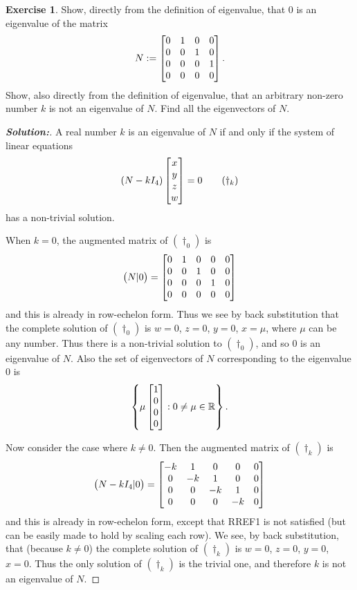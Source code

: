 \documentclass[a4paper]{amsart}
\theoremstyle{definition}
\newtheorem{exercise}{Exercise}
\newenvironment{solution}{\begin{proof}[\textbf{Solution:}] \vphantom{u}}{\end{proof}}
\begin{document}
\begin{exercise}\label{ex-evectors-iii}
 Show, directly from the definition of eigenvalue, that 0 is an eigenvalue
 of the matrix
 \[ N := \left[\begin{matrix} 
          0 & 1 & 0 & 0 \\
          0 & 0 & 1 & 0 \\
          0 & 0 & 0 & 1 \\
          0 & 0 & 0 & 0
         \end{matrix}\right].
 \]
 Show, also directly from the definition of eigenvalue, that an arbitrary non-zero
 number $k$ is not an eigenvalue of $N$.
 Find all the eigenvectors of $N$.
\end{exercise}
\begin{solution}
 A real number $k$ is an eigenvalue of $N$ if and only if the
 system of linear equations \[(N-kI_4)\left[\begin{matrix}
 x\\y\\z\\w\end{matrix}\right] = 0 \tag{$\dagger_k$}\] has a non-trivial
 solution.

 When $k = 0$, the augmented matrix of $(\dagger_0)$ is
 \[
 \big(N|0\big)= \left[\begin{matrix}
 0&1&0&0&0\\0&0&1&0&0\\0&0&0&1&0\\0&0&0&0&0\end{matrix}\right]
 \]
 and this
 is already in row-echelon form. Thus we see by back substitution
 that the complete solution of $(\dagger_0)$ is $w = 0$, $z = 0$,
 $y= 0$, $x = \mu$, where $\mu$ can be any number. Thus there is a
 non-trivial solution to $(\dagger_0)$, and so $0$ is an eigenvalue
 of $N$. Also the set of eigenvectors of $N$ corresponding to the
 eigenvalue $0$ is
 \[
 \left\{ \mu\left[\begin{matrix} 1\\0\\0\\0\end{matrix}\right] : 0 \neq \mu
 \in {\mathbb{R}} \right\}.
 \]

 Now consider the case where $k \neq 0$. Then the augmented matrix
 of $(\dagger_k)$ is
 \[
 \big(N-kI_4|0\big) = \left[\begin{matrix}
 -k&1&0&0&0\\0&-k&1&0&0\\0&0&-k&1&0\\0&0&0&-k&0\end{matrix}\right]
 \]
 and this
 is already in row-echelon form, except that RREF1 is not satisfied (but
 can be easily made to hold by scaling each row).
 We see, by back substitution, that
 (because $k \neq 0$) the complete solution of $(\dagger_k)$ is $w
 = 0$, $z = 0$, $y = 0$, $x = 0$. Thus the only solution of
 $(\dagger_k)$ is the trivial one, and therefore $k$ is not an
 eigenvalue of $N$.
\end{solution}
\end{document}
